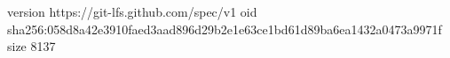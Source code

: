 version https://git-lfs.github.com/spec/v1
oid sha256:058d8a42e3910faed3aad896d29b2e1e63ce1bd61d89ba6ea1432a0473a9971f
size 8137
